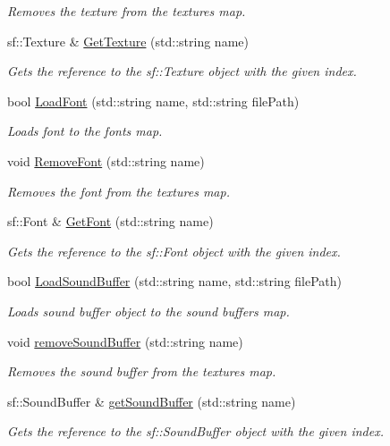 \begin{DoxyCompactItemize}
\begin{DoxyCompactList}\small\item\em Removes the texture from the textures map. \end{DoxyCompactList}\item 
sf\+::\+Texture \& \mbox{\hyperlink{class_arktis_engine_1_1_asset_manager_a3a44df92faeed35c9f9200f5b4446c0a}{Get\+Texture}} (std\+::string name)
\begin{DoxyCompactList}\small\item\em Gets the reference to the sf\+::\+Texture object with the given index. \end{DoxyCompactList}\item 
bool \mbox{\hyperlink{class_arktis_engine_1_1_asset_manager_a691afa1a5564f646dfb249008640cb26}{Load\+Font}} (std\+::string name, std\+::string file\+Path)
\begin{DoxyCompactList}\small\item\em Loads font to the fonts map. \end{DoxyCompactList}\item 
void \mbox{\hyperlink{class_arktis_engine_1_1_asset_manager_ad31adca114d126d15169de5895cdb0f3}{Remove\+Font}} (std\+::string name)
\begin{DoxyCompactList}\small\item\em Removes the font from the textures map. \end{DoxyCompactList}\item 
sf\+::\+Font \& \mbox{\hyperlink{class_arktis_engine_1_1_asset_manager_a5eedae3995e8e86fe49766f42e290dc6}{Get\+Font}} (std\+::string name)
\begin{DoxyCompactList}\small\item\em Gets the reference to the sf\+::\+Font object with the given index. \end{DoxyCompactList}\item 
bool \mbox{\hyperlink{class_arktis_engine_1_1_asset_manager_ad056af109292cee56e6506c597562d80}{Load\+Sound\+Buffer}} (std\+::string name, std\+::string file\+Path)
\begin{DoxyCompactList}\small\item\em Loads sound buffer object to the sound buffers map. \end{DoxyCompactList}\item 
void \mbox{\hyperlink{class_arktis_engine_1_1_asset_manager_adcbe38814d48f4f493a844210ae160c2}{remove\+Sound\+Buffer}} (std\+::string name)
\begin{DoxyCompactList}\small\item\em Removes the sound buffer from the textures map. \end{DoxyCompactList}\item 
sf\+::\+Sound\+Buffer \& \mbox{\hyperlink{class_arktis_engine_1_1_asset_manager_abf8ef54c6c562df3ec3fe93bb8643fe4}{get\+Sound\+Buffer}} (std\+::string name)
\begin{DoxyCompactList}\small\item\em Gets the reference to the sf\+::\+Sound\+Buffer object with the given index. \end{DoxyCompactList}\end{DoxyCompactItemize}


